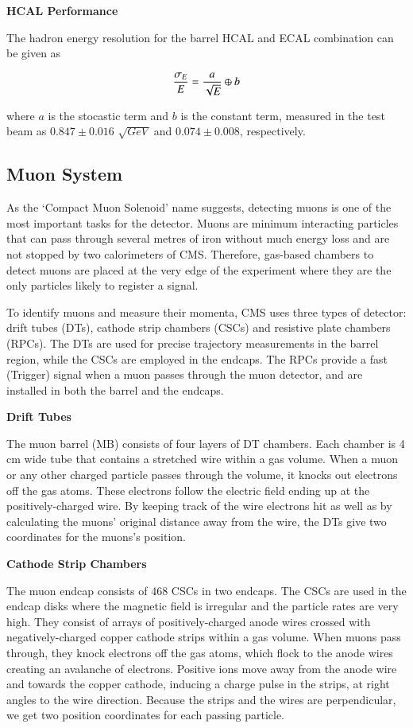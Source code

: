 {\bf HCAL Performance}

The hadron energy resolution for the barrel HCAL and ECAL combination can be given as 

\begin{equation} \label{hcalresolution}
\it \frac{\sigma_{E}}{E} = \frac{a}{\sqrt{E}}  \oplus b 
\end{equation}

where $a$ is the stocastic term and $b$ is the constant term, measured in the test beam as $0.847\pm 0.016$ $\sqrt{GeV}$ and $0.074 \pm 0.008$, respectively.


\subsection{Muon System}

As the `Compact Muon Solenoid' name suggests, detecting muons is one of the most important tasks for the detector. Muons are minimum interacting particles that can pass through several metres of iron   without much energy loss  and are not stopped by two calorimeters of CMS. Therefore, gas-based chambers to detect muons are placed at the very edge of the experiment where they are the only particles likely to register a signal. 

To identify muons and measure their momenta, CMS uses three types of detector: drift tubes (DTs), cathode strip chambers (CSCs) and resistive plate chambers (RPCs). The DTs are used for precise trajectory measurements in the barrel region, while the CSCs are employed in the endcaps. The RPCs provide a fast (Trigger) signal when a muon passes through the muon detector, and are installed in both the barrel and the endcaps.

{\bf Drift Tubes}

The muon barrel (MB) consists of four layers of DT chambers. Each chamber is 4 cm wide tube that contains a stretched wire within a gas volume. When a muon or any other charged particle passes through the volume, it knocks out electrons off the gas atoms. These electrons follow the electric field ending up at the positively-charged wire. By keeping track of the wire electrons hit as well as by calculating the muons' original distance away from the wire, the DTs give two coordinates for the muons's position.

{\bf Cathode Strip Chambers}

The muon endcap consists of 468 CSCs in two endcaps. The CSCs are used in the endcap disks where the magnetic field is irregular and the particle rates are very high. They consist of arrays of positively-charged anode wires crossed with negatively-charged copper cathode strips within a gas volume. When muons pass through, they knock electrons off the gas atoms, which flock to the anode wires creating an avalanche of electrons. Positive ions move away from the anode wire and towards the copper cathode, inducing a charge pulse in the strips, at right angles to the wire direction. Because the strips and the wires are perpendicular, we get two position coordinates for each passing particle.

